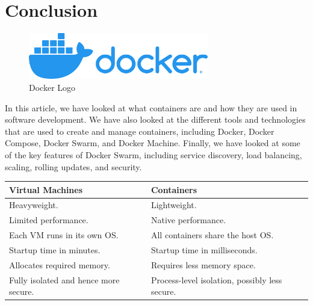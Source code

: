 \section{Conclusion}

\begin{figure}[h]
    \centering
    \includegraphics[width=0.7\textwidth]{./resources/images/horizontal-logo-monochromatic-white.png}
    \caption{Docker Logo}
    \label{fig:docker-logo}
\end{figure}

\clearpage

In this article, we have looked at what containers are and how they are used in software development. We have also looked at the different tools and technologies that are used to create and manage containers, including Docker, Docker Compose, Docker Swarm, and Docker Machine. Finally, we have looked at some of the key features of Docker Swarm, including service discovery, load balancing, scaling, rolling updates, and security.

\begin{table}[h]
    \begin{tabular}{|l|l|}
    \hline
    \textbf{Virtual Machines}             & \textbf{Containers}                            \\ \hline
    Heavyweight.                          & Lightweight.                                   \\
    Limited performance.                  & Native performance.                            \\
    Each VM runs in its own OS.           & All containers share the host OS.              \\
    Startup time in minutes.              & Startup time in milliseconds.                  \\
    Allocates required memory.            & Requires less memory space.                    \\
    Fully isolated and hence more secure. & Process-level isolation, possibly less secure. \\ \hline
    \end{tabular}
\end{table}